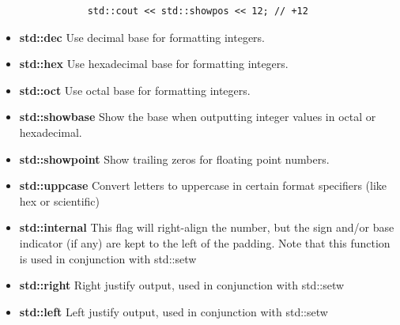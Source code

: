 \documentclass{report}
\begin{document}
\begin{itemize}
            \smallbreak
            \sepline
            \begin{verbatim}
            std::cout << std::showpos << 12; // +12
            \end{verbatim}
            \sepline
        \item \textbf{std::dec} Use decimal base for formatting integers.
        \item \textbf{std::hex} Use hexadecimal base for formatting integers.
        \item \textbf{std::oct} Use octal base for formatting integers.
        \item \textbf{std::showbase}  Show the base when outputting integer values in octal or hexadecimal.
        \item \textbf{std::showpoint} Show trailing zeros for floating point numbers.
        \item \textbf{std::uppcase} Convert letters to uppercase in certain format specifiers (like hex or scientific)
        \item \textbf{std::internal} This flag will right-align the number, but the sign and/or base indicator (if any) are kept to the left of the padding. Note that this function is used in conjunction with std::setw
        \item \textbf{std::right} Right justify output, used in conjunction with std::setw
        \item \textbf{std::left} Left justify output, used in conjunction with std::setw
    \end{itemize}

    \pagebreak \bigbreak \noindent 
\end{document}
